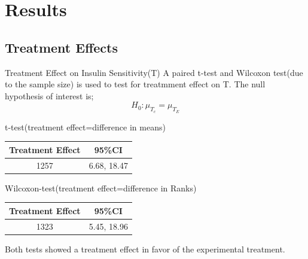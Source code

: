 \documentclass[a4paper,9pt]{beamer}\usepackage[]{graphicx}\usepackage[]{color}
\begin{document}
\section{Results}
\subsection{Treatment Effects}

\begin{frame}{Treatment Effect on Insulin Sensitivity(T)}
A paired t-test and Wilcoxon test(due to the sample size) is used to test for treatmment effect on T. The null hypothesis of interest is; $$H_0: \mu_{T_c} = \mu_{T_E}$$

\begin{block}{t-test(treatment effect=difference in means)}
\begin{table}[H]
\begin{tabular}{cc}
\hline
Treatment Effect & 95\%CI\\
\hline
1257 & 6.68, 18.47\\
\hline
\end{tabular}
\end{table}
\end{block}

\begin{block}{Wilcoxon-test(treatment effect=difference in Ranks)}
\begin{table}[H]
\begin{tabular}{cc}
\hline
Treatment Effect & 95\%CI\\
\hline
1323 & 5.45, 18.96\\
\hline
\end{tabular}
\end{table}
\end{block}

\alert{Both tests showed a treatment effect in favor of the experimental treatment}.
\end{frame}

\end{document}
